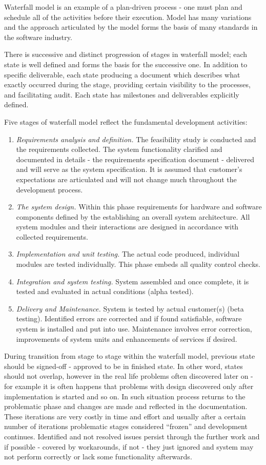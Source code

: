 Waterfall model is an example of a plan-driven process - one must plan and schedule all 
of the activities before their execution. Model has many variations and the approach 
articulated by the model forms the basis of many standards in the software industry.

There is successive and distinct progression of stages in waterfall model; each state 
is well defined and forms the basis for the successive one. In addition to specific 
deliverable, each state producing a document which describes what exactly occurred 
during the stage, providing certain visibility to the processes, and facilitating 
audit. Each state has milestones and deliverables explicitly defined.

Five stages of waterfall model reflect the fundamental development activities:
\begin{enumerate}
 \item \textit{Requirements analysis and definition.} The feasibility study 
is conducted 
and the requirements collected. The system functionality clarified and
documented in details - the requirements specification document - delivered  
and will serve as the system specification. It is assumed that customer's 
expectations are articulated and will not change much throughout the development 
process.
 \item \textit{The system design.} Within this phase requirements for hardware and 
software components defined by the establishing an overall system architecture.
All system modules and their interactions are designed in accordance with 
collected requirements.
 \item \textit{Implementation and unit testing.} The actual code produced, individual 
modules are tested individually. This phase embeds all quality control checks.
 \item \textit{Integration and system testing.} System assembled and once complete, it
is tested and evaluated in actual conditions (alpha tested).
 \item \textit{Delivery and Maintenance.} System is tested by actual customer(s) 
(beta testing). Identified errors are corrected and if found satisfiable, 
software system is installed and put into use. Maintenance involves error correction, 
improvements of system units and enhancements of services if desired.
\end{enumerate}

During transition from stage to stage within the waterfall model, previous state 
should be signed-off - approved to be in finished state. In other 
word, states should not overlap, however in the real life problems often discovered
later on - for example it is often happens that problems with design 
discovered only after implementation is started and so on. In such situation
process returns to the problematic phase and changes are made and reflected in 
the documentation. These iterations are very costly in time and effort and 
usually after a certain number of iterations problematic stages considered 
``frozen'' and development continues. Identified and not resolved issues persist
through the further work and if possible - covered by workarounds, if not - 
they just ignored and system may not perform correctly or lack some functionality 
afterwards.

